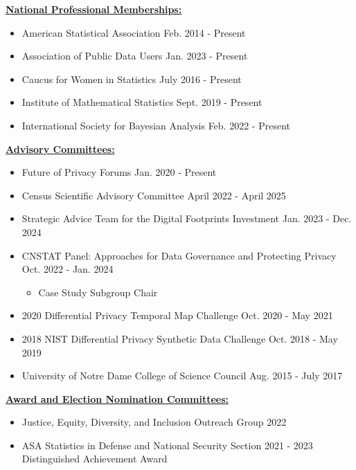 
\underline{\textbf{\large National Professional Memberships:}}\normalsize
\begin{itemize}
    \item American Statistical Association \hfill Feb. 2014 - Present %
    \item Association of Public Data Users \hfill Jan. 2023 - Present
    \item Caucus for Women in Statistics \hfill July 2016 - Present
    \item Institute of Mathematical Statistics \hfill Sept. 2019 - Present
    \item International Society for Bayesian Analysis \hfill Feb. 2022 - Present
\end{itemize}

\professionalspace
\underline{\textbf{\large Advisory Committees:}}\normalsize
\begin{itemize}
    \item Future of Privacy Forums \hfill Jan. 2020 - Present
    \item Census Scientific Advisory Committee \hfill April 2022 - April 2025
    \item Strategic Advice Team for the Digital Footprints Investment \hfill Jan. 2023 - Dec. 2024
    \item CNSTAT Panel: Approaches for Data Governance and Protecting Privacy \hfill Oct. 2022 - Jan. 2024
    \begin{itemize}
        \item Case Study Subgroup Chair
    \end{itemize}
    \item 2020 Differential Privacy Temporal Map Challenge \hfill Oct. 2020 - May 2021
    \item 2018 NIST Differential Privacy Synthetic Data Challenge \hfill Oct. 2018 - May 2019
    \item University of Notre Dame College of Science Council \hfill Aug. 2015 - July 2017
\end{itemize}

\professionalspace
\underline{\textbf{\large Award and Election Nomination Committees:}}\normalsize
\begin{itemize}
    \item Justice, Equity, Diversity, and Inclusion Outreach Group \hfill 2022
    \item ASA Statistics in Defense and National Security Section \hfill 2021 - 2023\\ Distinguished Achievement Award
\end{itemize}

